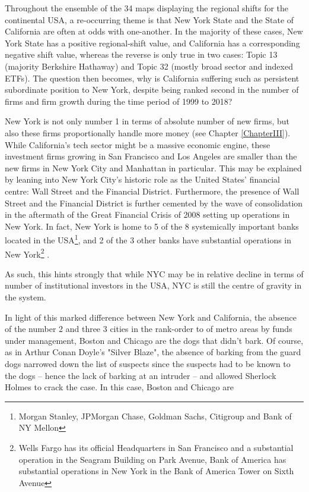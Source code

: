 Throughout the ensemble of the 34 maps displaying the regional shifts for the continental USA, a re-occurring theme is that New York State and the State of California are often at odds with one-another. In the majority of these cases, New York State has a positive regional-shift value, and California has a corresponding negative shift value, whereas the reverse is only true in two cases: Topic 13 (majority Berkshire Hathaway) and Topic 32 (mostly broad sector and indexed ETFs).   The question then becomes, why is California suffering such as persistent subordinate position to New York, despite being ranked second in the number of firms and firm growth during the time period of 1999 to 2018?  

New York is not only number 1 in terms of absolute number of new firms, but also these firms proportionally handle more money (see Chapter \ref{ChapterIII}).  While California's tech sector might be a massive economic engine, these investment firms growing in San Francisco and Los Angeles are smaller than the new firms in New York City and Manhattan in particular. This may be explained by leaning into New York City's historic role as the United States' financial centre: Wall Street and the Financial District.  Furthermore, the presence of Wall Street and the Financial District is further cemented by the wave of consolidation in the aftermath of the Great Financial Crisis of 2008 setting up operations in New York. In fact, New York is home to 5 of the 8 systemically important banks located in the USA\footnote{Morgan Stanley, JPMorgan Chase, Goldman Sachs, Citigroup and Bank of NY Mellon}, and 2 of the 3 other banks have substantial operations in New York\footnote{Wells Fargo has its official Headquarters in San Francisco and a substantial operation in the Seagram Building on Park Avenue,  Bank of America has substantial operations in New York in the Bank of America Tower on Sixth Avenue} \citep{FSB2019}. 

As such, this hints strongly that while NYC may be in relative decline in terms of number of institutional investors in the USA, NYC is still the centre of gravity in the system.  

In light of this marked difference between New York and California, the absence of the number 2 and three 3 cities in the rank-order to of metro areas by funds under management, Boston and Chicago are the dogs that didn't bark.  Of course, as in Arthur Conan Doyle's "Silver Blaze", the absence of barking from the guard dogs narrowed down the list of suspects since the suspects had to be known to the dogs -- hence the lack of barking at an intruder -- and allowed Sherlock Holmes to crack the case.  In this case, Boston and Chicago are 

